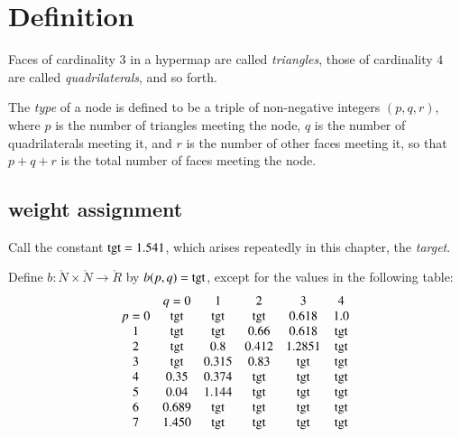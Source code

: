 \section{Definition}


\begin{definition}
Faces of cardinality $3$ in a hypermap are called {\it triangles}, those of
cardinality $4$ are called {\it quadrilaterals}, and so forth.  
\end{definition}

\begin{definition}[type,~$(p,q,r)$]\label{definition:type}
The {\it type\/} of a node is defined to be a triple of
non-negative integers $(p,q,r)$, where $p$ is the number of
triangles meeting the node, $q$ is the number of quadrilaterals
meeting it, and $r$ is the number of other faces meeting it, so that
$p+q+r$ is the total number of faces meeting the node.
%
%
\end{definition}


\subsection{weight assignment}\label{sec:wtassign}
%

Call the constant ${\operatorname{tgt}}=1.541$, which arises repeatedly in
this chapter, the {\it target}. 
%
%


\begin{definition}[b]
  Define $b:\ring{N}\times \ring{N}\to \ring{R}$ by $b(p,q)={\operatorname{tgt}}$,
  except for the values in the following table:
  {
  \def\tx{\op{tgt}}
  $$\begin{matrix}  &q=0&1&2&3&4\\
           p=0&\tx&\tx&\tx&0.618&1.0\\
           1&\tx&\tx&0.66&0.618&\tx\\
           2&\tx&0.8&0.412&1.2851&\tx\\
           3&\tx&0.315&0.83&\tx&\tx\\
           4&0.35&0.374&\tx&\tx&\tx\\
           5&0.04&1.144&\tx&\tx&\tx\\
           6&0.689&\tx&\tx&\tx&\tx\\
           7&1.450&\tx&\tx&\tx&\tx
   \end{matrix}
   $$
   }
%
\end{definition}


